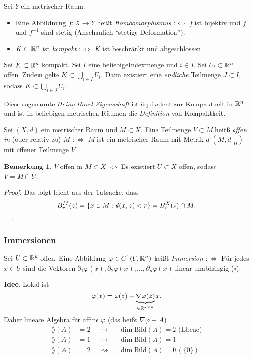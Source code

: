 \documentclass[
 a4paper,
 12pt,
 parskip=half
 ]{scrartcl}
\theoremstyle{plain}
\theoremstyle{definition}
\newtheorem*{rmrk}{Bemerkung}
\numberwithin{equation}{section}
\begin{document}
Sei $Y$ ein metrischer Raum.
\begin{itemize}
 \item Eine Abbildnung $f: X \to Y$ heißt \emph{Homöomorphismus} $:\Leftrightarrow$ $f$ ist bijektiv und $f$ und $f^{-1}$ sind stetig (Anschaulich ``stetige Deformation'').
 \item $K \subset \mathbb{R}^n$ ist \emph{kompakt} $:\Leftrightarrow$ $K$ ist beschränkt und abgeschlossen.
\end{itemize}

\begin{thm}
 Sei $K \subset \mathbb{R}^n$ kompakt. Sei $I$ eine beliebige\footnotemark Indexmenge und $i \in I$. Sei $U_i \subset \mathbb{R}^n$ offen. Zudem gelte $K \subset \bigcup_{i \in I} U_i$. Dann existiert eine \emph{endliche} Teilmenge $J \subset I$, sodass $K \subset \bigcup_{i \in J} U_i$.
\end{thm}

Diese sogenannte \emph{Heine-Borel-Eigenschaft} ist äquivalent zur Kompaktheit in $\mathbb{R}^n$ und ist in beliebigen metrischen Räumen die \emph{Definition} von Kompaktheit.

Sei $(X,d)$ ein metrischer Raum und $M \subset X$. Eine Teilmenge $V \subset M$ heitß \emph{offen in} (oder relativ zu) $M$ $:\Leftrightarrow$ $M$ ist ein metrischer Raum mit Metrik $d$ $(M,d|_M)$ mit offener Teilmenge $V$.

\begin{rmrk}
$V$ offen in $M \subset X$ $\Leftrightarrow$ Es existiert $U \subset X$ offen, sodass $V = M \cap U$.
\end{rmrk}

\begin{proof}
 Das folgt leicht aus der Tatsache, dass 
 \[ B_r^M(z) = \{ x \in M: d(x,z) < r \} = B_r^X(z) \cap M. \qedhere \]
\end{proof}

\subsubsection{Immersionen}
Sei $U \subset \mathbb{R}^k$ offen. Eine Abbildung $\varphi \in C^1(U, \mathbb{R}^n)$ heißt \emph{Immersion} $:\Leftrightarrow$ Für jedes $x \in U$ sind die Vektoren $\partial_1 \varphi(x), \partial_2 \varphi(x), \ldots, \partial_n \varphi(x)$ linear unabhängig ($\circ$).

\textbf{Idee.} Lokal ist 
\[ \varphi(x) = \varphi(z) + \underbrace{\nabla \varphi(z)}_{\in \mathbb{R}^{k \times n}} x. \]
Daher lineare Algebra für affine $\varphi$ (das heißt $\nabla\varphi \equiv A$)
\[ \begin{aligned}
   \rang(A) &= 2 & &\rightsquigarrow & &\dim \text{Bild}(A) = 2 \text{ (Ebene)} \\
   \rang(A) &= 1 & &\rightsquigarrow & &\dim \text{Bild}(A) = 1  \\
   \rang(A) &= 2 & &\rightsquigarrow & &\dim \text{Bild}(A) = 0 \, (\{0\})
   \end{aligned} \]
   
\end{document}
